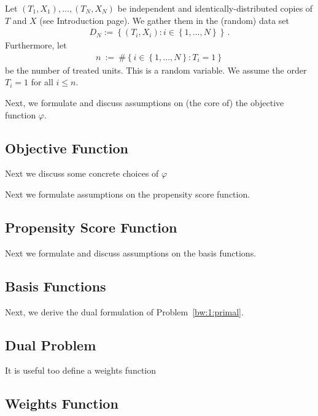 Let $(T_1,X_1),\ldots,(T_N,X_N)$ be independent and identically-distributed copies of $T$ and $X$ (see Introduction page). 
We gather them in the (random) data set 
\begin{gather*}
D_N:=\left\{ (T_i,X_i)\colon i\in \left\{ 1,\ldots,N \right\} \right\}
\,.
\end{gather*}
Furthermore, let
\begin{gather*}
  n
  \ 
  :=
  \ 
  \# 
  \left\{ 
    i\in \left\{ 1,\ldots,N \right\}
    \colon
    T_i=1
  \right\}
\end{gather*}
be the number of treated units. This is a random variable. We assume the order $T_i=1$ for all $i\le n$.



Next, we formulate and discuss assumptions on (the core of) the objective function $\varphi$.
\subsection{Objective Function}


Next we discuss some concrete choices of $\varphi$



Next we formulate assumptions on the propensity score function.
\subsection{Propensity Score Function}



Next we formulate and discuss assumptions on the basis functions.
\subsection{Basis Functions}


Next, we derive the dual formulation of Problem~\ref{bw:1:primal}.
\subsection{Dual Problem}


It is useful too define a weights function

\subsection{Weights Function}

